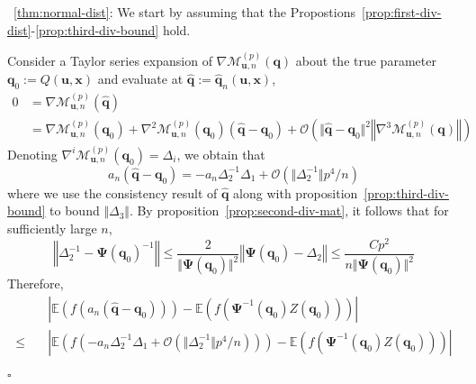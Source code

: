 \documentclass[aos]{imsart}
\theoremstyle{plain}
\theoremstyle{remark}
\def\E{\mathbb{E}}
\newcommand{\Mcal}{\mathcal{M}}
\newcommand{\bb}[1]{\boldsymbol{#1}}
\newenvironment{pfofThm}{\noindent{\bf Proof of Theorem}}{\hfill $\square$ \\}
\begin{document}

\begin{pfofThm}~\ref{thm:normal-dist}:
 We start by assuming that the Propostions~\ref{prop:first-div-dist}-\ref{prop:third-div-bound} hold.

    Consider a Taylor series expansion of $\nabla \Mcal_{\bb{u}, n}^{(p)}(\bb{q})$ about the true parameter $\bb{q}_0 := Q(\bb{u}, \bb{x})$ and evaluate at $\widehat{\bb{q}} := \widehat{\bb{q}}_n(\bb{u},\bb{x})$,
    \begin{align*}
        0 & = \nabla \Mcal_{\bb{u}, n}^{(p)}(\widehat{\bb{q}})\\
        & = \nabla \Mcal_{\bb{u}, n}^{(p)}(\bb{q}_0) + \nabla^2 \Mcal_{\bb{u}, n}^{(p)}(\bb{q}_0)(\widehat{\bb{q}} - \bb{q}_0) + \mathcal{O}(\Vert \widehat{\bb{q}} - \bb{q}_0\Vert^2 \left\Vert \nabla^3\Mcal_{\bb{u}, n}^{(p)}(\bb{q}) \right\Vert )
    \end{align*}
    Denoting $\nabla^{i} \Mcal_{\bb{u}, n}^{(p)}(\bb{q}_0) = \Delta_{i}$, we obtain that
    \begin{equation*}
        a_n\left( \widehat{\bb{q}} - \bb{q}_0 \right) = -a_n \Delta_{2}^{-1} \Delta_1 + \mathcal{O}(\Vert \Delta_2^{-1}\Vert p^4/n) 
    \end{equation*}
    \noindent where we use the consistency result of $\widehat{\bb{q}}$ along with proposition~\ref{prop:third-div-bound} to bound $\Vert \Delta_3\Vert$. By proposition~\ref{prop:second-div-mat}, it follows that for sufficiently large $n$,
    \begin{equation*}
        \left\Vert \Delta_2^{-1} - \bb{\Psi}(\bb{q}_0)^{-1}\right\Vert \leq \dfrac{2}{\Vert \bb{\Psi}(\bb{q}_0) \Vert^2} \left\Vert \bb{\Psi}(\bb{q}_0) - \Delta_{2}\right\Vert \leq \dfrac{Cp^2}{n\Vert \bb{\Psi}(\bb{q}_0) \Vert^2}
    \end{equation*}
    Therefore,
    \begin{align*}
        & \quad \left\vert \E\left( f\left( a_n\left( \widehat{\bb{q}} - \bb{q}_0 \right) \right) \right) - \E\left( f\left( \bb{\Psi}^{-1}(\bb{q}_0) Z(\bb{q}_0) \right)  \right) \right\vert \\
        \leq & \quad \left\vert \E\left( f\left( -a_n \Delta_{2}^{-1} \Delta_1 + \mathcal{O}(\Vert \Delta_2^{-1}\Vert p^4/n) \right) \right) - \E\left( f\left( \bb{\Psi}^{-1}(\bb{q}_0) Z(\bb{q}_0) \right)  \right) \right\vert \\

\end{align*}
\end{pfofThm}
\end{document}
